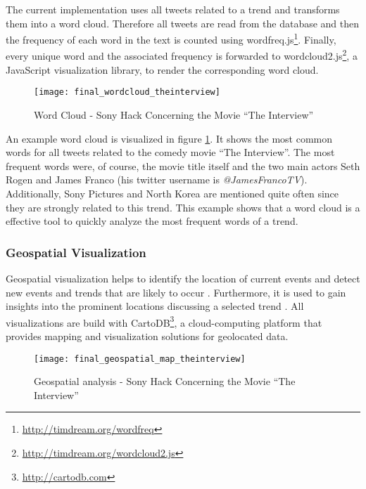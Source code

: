 The current implementation uses all tweets related to a trend and transforms them into a word cloud. Therefore all tweets are read from the database and then the frequency of each word in the text is counted using wordfreq.js\footnote{\url{http://timdream.org/wordfreq} \accessednote}. Finally, every unique word and the associated frequency is forwarded to wordcloud2.js\footnote{\url{http://timdream.org/wordcloud2.js} \accessednote}, a JavaScript visualization library, to render the corresponding word cloud.

\begin{figure}[H]
  \centering
        \texttt{[image: final\_wordcloud\_theinterview]}
  \caption[Word Cloud - Sony Hack Concerning the Movie \enquote{The Interview}]{Word Cloud - Sony Hack Concerning the Movie \enquote{The Interview}}
  \label{fig:word-cloud-interview}
  \vspace{-1.3em}
\end{figure}

An example word cloud is visualized in figure \ref{fig:word-cloud-interview}. It shows the most common words for all tweets related to the comedy movie \enquote{The Interview}. The most frequent words were, of course, the movie title itself and the two main actors Seth Rogen and James Franco (his twitter username is \textit{@JamesFrancoTV}). Additionally, Sony Pictures and North Korea are mentioned quite often since they are strongly related to this trend. This example shows that a word cloud is a effective tool to quickly analyze the most frequent words of a trend.

\subsubsection{Geospatial Visualization}
\label{subsubsection:vis-geospatial}
Geospatial visualization helps to identify the location of current events and detect new events and trends that are likely to occur \cite{TwitterDataAnalytics2013}. Furthermore, it is used to gain insights into the prominent locations discussing a selected trend \cite[64-66]{TwitterDataAnalytics2013}. All visualizations are build with CartoDB\footnote{\url{http://cartodb.com} \accessednote}, a cloud-computing platform that provides mapping and visualization solutions for geolocated data.

\begin{figure}[H]
  \centering
        \texttt{[image: final\_geospatial\_map\_theinterview]}
  \caption[Geospatial analysis - Sony Hack Concerning the Movie \enquote{The Interview}]{Geospatial analysis - Sony Hack Concerning the Movie \enquote{The Interview}}
  \label{fig:map-interview}
  \vspace{-1.3em}
\end{figure}

